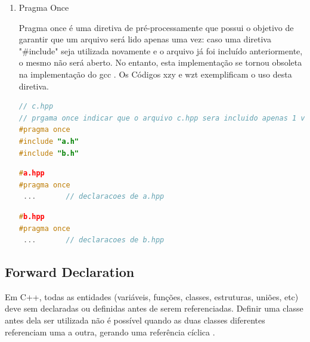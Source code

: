 \begin{enumerate}
\item Pragma Once

Pragma once é uma diretiva de pré-processamente que possui o objetivo de
 garantir que um arquivo será lido apenas uma vez: caso uma diretiva 
"\#include" seja utilizada novamente e o arquivo já foi incluído anteriormente,
 o mesmo não será aberto. No entanto, esta implementação se tornou obsoleta 
 na implementação do gcc \cite{gcc-pragma_once}. Os Códigos xzy e wzt exemplificam o uso 
desta diretiva.



\begin{lstlisting}[language=C++,frame=single,title={Código 10:
                                    Exemplo de arquivo c.hpp com guarda de 
                                         inclusão que utiliza "\#pragma once"},
                                                            label=codigo_10]
// c.hpp
// prgama once indicar que o arquivo c.hpp sera incluido apenas 1 vez
#pragma once            
#include "a.h"
#include "b.h"
\end{lstlisting}
\begin{lstlisting}[language=C++,frame=single,title={Código 11: 
                                   Exemplo de arquivo a.hpp com guarda de 
                                    inclusão que utiliza "\#pragma once"},
                                                            label=codigo_11]
#a.hpp
#pragma once 
 ...       // declaracoes de a.hpp

\end{lstlisting}

\begin{lstlisting}[language=C++,frame=single,title={Código 12: 
                                   Exemplo de arquivo b.hpp com guarda de 
                                      inclusão que utiliza "\#pragma once"},
                                                            label=codigo_12]
#b.hpp
#pragma once 
 ...       // declaracoes de b.hpp

\end{lstlisting}

\end{enumerate}



\subsection{Forward Declaration}

Em C++, todas as entidades (variáveis, funções, classes, estruturas, uniões,
 etc) deve sem declaradas ou definidas antes de serem referenciadas. Definir
 uma classe antes dela ser utilizada não é possível quando as duas classes
 diferentes referenciam uma a outra, gerando uma referência cíclica
\cite{ref43}.

